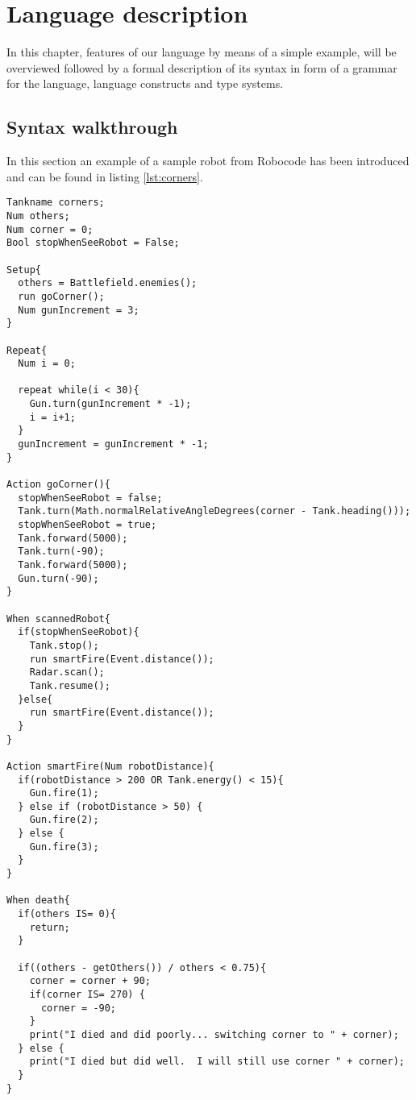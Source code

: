 \chapter{Language description}
\label{chap:LanguageDescription}
In this chapter, features of our language by means of a simple example, will be overviewed followed by a formal description of its syntax in form of a grammar for the language, language constructs and type systems. 

\section{Syntax walkthrough}
In this section an example of a sample robot from Robocode has been introduced and can be found in listing \ref{lst:corners}.

\begin{lstlisting}[caption={Eksampel of the sample robot "Corners" in our language}, label={lst:corners}]
Tankname corners;
Num others;
Num corner = 0;
Bool stopWhenSeeRobot = False;

Setup{
  others = Battlefield.enemies();  
  run goCorner();	 
  Num gunIncrement = 3;
}

Repeat{  
  Num i = 0;
  
  repeat while(i < 30){
    Gun.turn(gunIncrement * -1);
    i = i+1;
  }  
  gunIncrement = gunIncrement * -1;
}

Action goCorner(){
  stopWhenSeeRobot = false;  
  Tank.turn(Math.normalRelativeAngleDegrees(corner - Tank.heading()));      
  stopWhenSeeRobot = true;
  Tank.forward(5000);
  Tank.turn(-90);
  Tank.forward(5000);
  Gun.turn(-90);
}

When scannedRobot{
  if(stopWhenSeeRobot){
    Tank.stop();                                     
    run smartFire(Event.distance());
    Radar.scan();                                     
    Tank.resume();                                   
  }else{
    run smartFire(Event.distance());
  }
}

Action smartFire(Num robotDistance){
  if(robotDistance > 200 OR Tank.energy() < 15){
    Gun.fire(1);
  } else if (robotDistance > 50) {
    Gun.fire(2);
  } else {
    Gun.fire(3);
  }
}

When death{
  if(others IS= 0){
    return;
  }
  
  if((others - getOthers()) / others < 0.75){
    corner = corner + 90;
    if(corner IS= 270) {
      corner = -90;
    }
    print("I died and did poorly... switching corner to " + corner);
  } else {
    print("I died but did well.  I will still use corner " + corner);
  }
}
\end{lstlisting}

